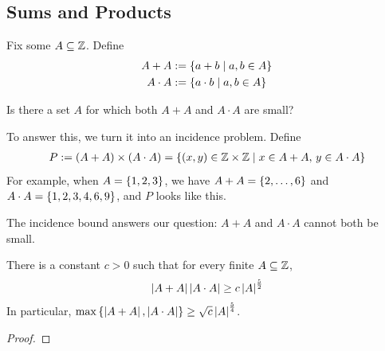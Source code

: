 \subsection{Sums and Products}

Fix some $A \subseteq \mathbb{Z}$. Define
\begin{align*}
    A + A &:= \left\{ a + b \; \middle\vert \; a, b \in A \right\} \\
    A \cdot A &:= \left\{ a \cdot b \; \middle\vert \; a, b \in A \right\}
\end{align*}

Is there a set $A$ for which both $A + A$ and $A \cdot A$ are small?

To answer this, we turn it into an incidence problem. Define
\begin{align*}
    P := \left( A + A \right) \times \left( A \cdot A \right)
    = \left\{ (x, y) \in \mathbb{Z} \times \mathbb{Z} \; \middle\vert \; x \in A + A, \, y \in A \cdot A \right\}
\end{align*}
For example, when $A = \left\{ 1, 2, 3 \right\}$, we have $A + A = \left\{ 2, \ldots, 6 \right\}$ and $A \cdot A = \left\{ 1, 2, 3, 4, 6, 9 \right\}$, and $P$ looks like this.
\begin{figure}[H]
    \centering
\end{figure}

The incidence bound answers our question: $A + A$ and $A \cdot A$ cannot both be small.

\begin{boxtheorem} \label{Ch7:Thm:Sum_Product}
    There is a constant $c > 0$ such that for every finite $A \subseteq \mathbb{Z}$,
    \begin{align*}
        \left\lvert A + A \right\rvert \left\lvert A \cdot A \right\rvert \geq c \left\lvert A \right\rvert^{\frac{5}{2}}
    \end{align*}
    In particular, $\max\left\{ \left\lvert A + A \right\rvert, \left\lvert A \cdot A \right\rvert \right\} \geq \sqrt{c} \left\lvert A \right\rvert^{\frac{5}{4}}$.
\end{boxtheorem}
\begin{proof}
    \sorry
\end{proof}
